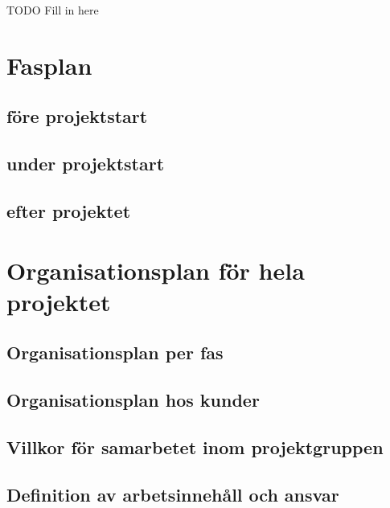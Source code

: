 \documentclass[projektplan/plan.tex]{subfiles}
\begin{document}
TODO Fill in here
\section{Fasplan}
\subsection{före projektstart}
\subsection{under projektstart}
\subsection{efter projektet}

\section{Organisationsplan för hela projektet}
\subsection{Organisationsplan per fas}
\subsection{Organisationsplan hos kunder}
\subsection{Villkor för samarbetet inom projektgruppen}
\subsection{Definition av arbetsinnehåll och ansvar}
\end{document}
